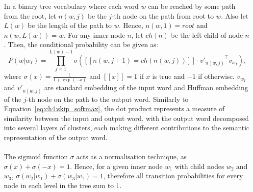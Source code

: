 \documentclass[a4paper,12pt,twoside,openright]{report}
\newcommand{\nl}{\\ \\}
\begin{document}
In a binary tree vocabulary where each word $w$ can be reached by some path from the root, let $n(w,j)$ be the $j$-th node on the path from root to $w$. Also let $L(w)$ be the length of the path to $w$. Hence, $n(w,1)=root$ and $n(w,L(w))=w$. For any inner node $n$, let $ch(n)$ be the left child of node $n$. Then, the conditional probability can be given as:
\begin{equation}
P(w|w_I)=\prod_{j=1}^{L(w)-1}{\sigma([\![n(w,j+1)=ch(n(w,j))]\!]\cdot {v'_{n(w,j)}}^{\intercal} v_{w_I} )},
\label{eq:ch4:morin}
\end{equation}
where $\sigma(x)=\frac{1}{1+\exp(-x)}$ and $[\![x]\!]=1$ if $x$ is true and $-1$ if otherwise. $v_{w_I}$ and ${v'_{n(w,j)}}$ are standard embedding of the input word and Huffman embedding of the $j$-th node on the path to the output word. Similarly to Equation~\ref{eq:ch4:skip_softmax}, the dot product represents a measure of similarity between the input and output word, with the output word decomposed into several layers of clusters, each making different contributions to the semantic representation of the output word.
\nl
The sigmoid function $\sigma$ acts as a normalisation technique, as $\sigma(x)+\sigma(-x)=1$. Hence, for a given inner node $w_1$ with child nodes $w_2$ and $w_3$, $\sigma(w_2|w_1) + \sigma(w_3|w_1)=1$, therefore all transition probabilities for every node in each level in the tree sum to 1.
\end{document}
